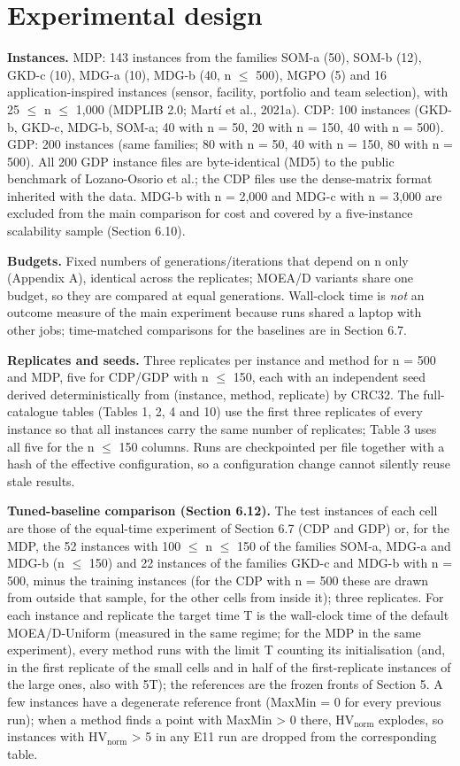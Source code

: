 \section{Experimental design}\label{sec:experimental_design}

\textbf{Instances.} MDP: 143 instances from the families SOM-a (50), SOM-b (12), GKD-c (10), MDG-a (10), MDG-b (40, n $\leq$ 500), MGPO (5) and 16 application-inspired instances (sensor, facility, portfolio and team selection), with 25 $\leq$ n $\leq$ 1,000 (MDPLIB 2.0; Martí et al., 2021a). CDP: 100 instances (GKD-b, GKD-c, MDG-b, SOM-a; 40 with n = 50, 20 with n = 150, 40 with n = 500). GDP: 200 instances (same families; 80 with n = 50, 40 with n = 150, 80 with n = 500). All 200 GDP instance files are byte-identical (MD5) to the public benchmark of Lozano-Osorio et al.; the CDP files use the dense-matrix format inherited with the data. MDG-b with n = 2,000 and MDG-c with n = 3,000 are excluded from the main comparison for cost and covered by a five-instance scalability sample (Section 6.10).

\textbf{Budgets.} Fixed numbers of generations/iterations that depend on n only (Appendix A), identical across the replicates; MOEA/D variants share one budget, so they are compared at equal generations. Wall-clock time is \emph{not} an outcome measure of the main experiment because runs shared a laptop with other jobs; time-matched comparisons for the baselines are in Section 6.7.

\textbf{Replicates and seeds.} Three replicates per instance and method for n = 500 and MDP, five for CDP/GDP with n $\leq$ 150, each with an independent seed derived deterministically from (instance, method, replicate) by CRC32. The full-catalogue tables (Tables 1, 2, 4 and 10) use the first three replicates of every instance so that all instances carry the same number of replicates; Table 3 uses all five for the n $\leq$ 150 columns. Runs are checkpointed per file together with a hash of the effective configuration, so a configuration change cannot silently reuse stale results.

\textbf{Tuned-baseline comparison (Section 6.12).} The test instances of each cell are those of the equal-time experiment of Section 6.7 (CDP and GDP) or, for the MDP, the 52 instances with 100 $\leq$ n $\leq$ 150 of the families SOM-a, MDG-a and MDG-b (n $\leq$ 150) and 22 instances of the families GKD-c and MDG-b with n = 500, minus the training instances (for the CDP with n = 500 these are drawn from outside that sample, for the other cells from inside it); three replicates. For each instance and replicate the target time T is the wall-clock time of the default MOEA/D-Uniform (measured in the same regime; for the MDP in the same experiment), every method runs with the limit T counting its initialisation (and, in the first replicate of the small cells and in half of the first-replicate instances of the large ones, also with 5T); the references are the frozen fronts of Section 5. A few instances have a degenerate reference front (MaxMin = 0 for every previous run); when a method finds a point with MaxMin > 0 there, $\mathrm{HV}_{\mathrm{norm}}$ explodes, so instances with $\mathrm{HV}_{\mathrm{norm}}$ > 5 in any E11 run are dropped from the corresponding table.


